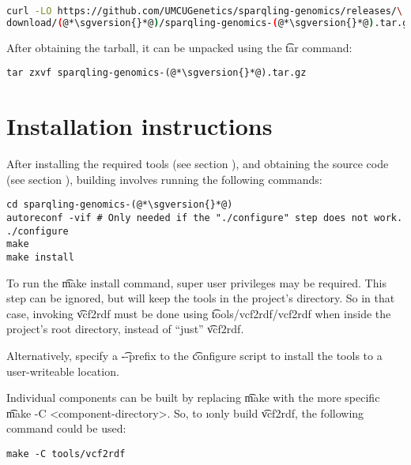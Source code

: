 \begin{lstlisting}[language=bash]
curl -LO https://github.com/UMCUGenetics/sparqling-genomics/releases/\
download/(@*\sgversion{}*@)/sparqling-genomics-(@*\sgversion{}*@).tar.gz
\end{lstlisting}

  After obtaining the tarball, it can be unpacked using the \t{tar}
  command:

\begin{lstlisting}
tar zxvf sparqling-genomics-(@*\sgversion{}*@).tar.gz
\end{lstlisting}

\section{Installation instructions}

  After installing the required tools (see section ),
  and obtaining the source code (see section \refer{sec:obtaining-tarball}),
  building involves running the following commands:

\begin{lstlisting}
cd sparqling-genomics-(@*\sgversion{}*@)
autoreconf -vif # Only needed if the "./configure" step does not work.
./configure
make
make install
\end{lstlisting}

  To run the \t{make install} command, super user privileges may be
  required.  This step can be ignored, but will keep the tools in the project's
  directory.  So in that case, invoking \t{vcf2rdf} must be done using
  \t{tools/vcf2rdf/vcf2rdf} when inside the project's root directory,
  instead of ``just'' \t{vcf2rdf}.

  Alternatively, specify a \t{-{}-prefix} to the \t{configure}
  script to install the tools to a user-writeable location.

  Individual components can be built by replacing \t{make} with the
  more specific \t{make -C <component-directory>}.  So, to \i{only}
  build \t{vcf2rdf}, the following command could be used:

\begin{lstlisting}
make -C tools/vcf2rdf
\end{lstlisting}
